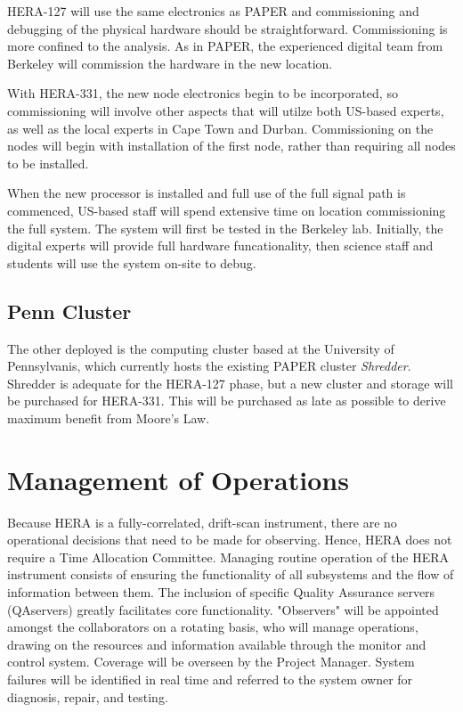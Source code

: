 \documentclass[preprint]{aastex}
\begin{document}
HERA-127 will use the same electronics as PAPER and commissioning and debugging of the physical
hardware should be straightforward.  Commissioning is more confined to the analysis.  As in PAPER,
the experienced digital team from Berkeley will commission the hardware in the new location.

With HERA-331, the new node electronics begin to be incorporated, so commissioning will involve
other aspects that will utilze both US-based experts, as well as the local experts in Cape Town and Durban.
Commissioning on the nodes will begin with installation of the first node, rather than requiring all nodes
to be installed.

When the new processor is installed and full use of the full signal path is commenced, US-based staff
will spend extensive time on location commissioning the full system.  The system will first be tested in the Berkeley lab.  
Initially, the digital experts will provide full hardware funcationality, then science staff and students will use the system on-site to debug.

\subsection{Penn Cluster}
The other deployed is the computing cluster based at the University of Pennsylvanis, which currently hosts the existing
PAPER cluster {\em Shredder}.  Shredder is adequate for the HERA-127 phase, but a new cluster and storage will be
purchased for HERA-331.  This will be purchased as late as possible to derive maximum benefit from Moore's Law.

\section{Management of Operations}
\label{sec:operations}

Because HERA is a fully-correlated, drift-scan instrument, there are no operational
decisions that need to be made for observing. Hence, HERA does not require a Time
Allocation Committee. Managing routine operation of the HERA instrument consists of
ensuring the functionality of all subsystems and the flow of information between
them. The inclusion of specific Quality Assurance servers (QAservers) greatly
facilitates core functionality. "Observers" will be appointed amongst the
collaborators on a rotating basis, who will manage operations, drawing on the
resources and information available through the monitor and control system. Coverage
will be overseen by the Project Manager. System failures will be identified in real
time and referred to the system owner for diagnosis, repair, and testing.
\end{document}
